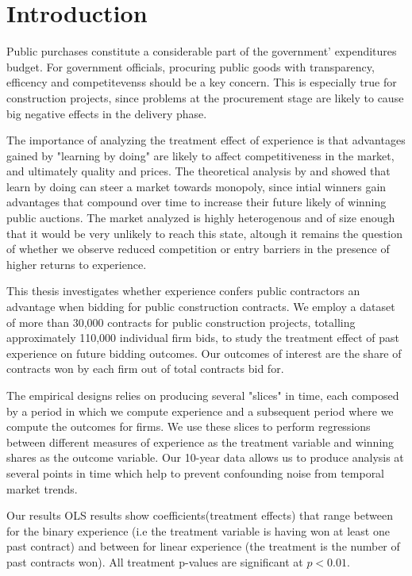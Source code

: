\chapter{Introduction}
Public purchases constitute a considerable part of the government' expenditures budget. For government officials, procuring public goods with transparency, efficency and competitevenss should be a key concern. This is especially true for construction projects,
since problems at the procurement stage are likely to cause big negative effects in the delivery phase. 

The importance of analyzing the treatment effect of experience is that advantages gained by "learning by doing" are likely to affect competitiveness in the market, and ultimately quality and prices. The theoretical analysis by and showed that learn by doing can steer a market towards monopoly, since intial winners gain advantages that compound over time to increase their future likely of winning public auctions. The market analyzed is highly heterogenous and of size enough that it would be very unlikely to reach this state, altough it remains the question of whether we observe reduced competition or entry barriers in the presence of higher returns to experience.

This thesis investigates whether experience confers public contractors an advantage when bidding for public construction contracts. We employ a dataset of more than 30,000 contracts for public construction projects, totalling approximately 110,000 individual firm bids, to study the treatment effect of past experience on future bidding outcomes. Our outcomes of interest are the share of contracts won by each firm out of total contracts bid for.

The empirical designs relies on producing several "slices" in time, each composed by a period in which we compute experience and a subsequent period where we compute the outcomes for firms. We use these slices to perform regressions between different measures of experience as the treatment variable and winning shares as the outcome variable. Our 10-year data allows us to produce analysis at several points in time which help to prevent confounding noise from temporal market trends.

Our results OLS results show coefficients(treatment effects) that range between for the binary experience (i.e the treatment variable is having won at least one past contract) and between for linear experience (the treatment is the number of past contracts won). All treatment p-values are significant at $p<0.01$.

